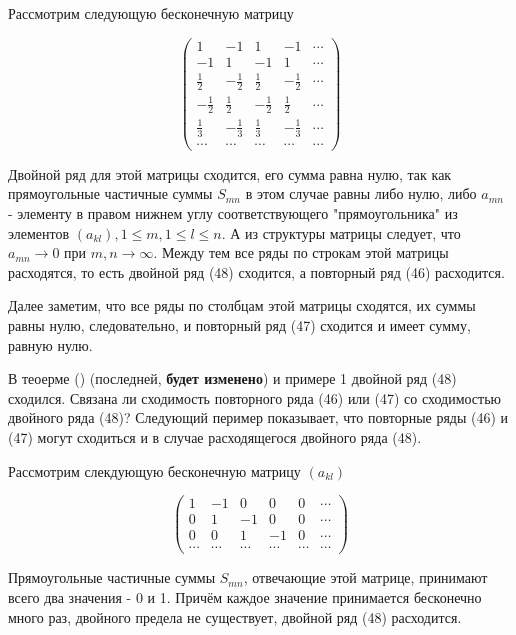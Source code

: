  \begin{exmpl}
 	Рассмотрим следующую бесконечную матрицу
 	
 	\begin{equation*}
 		\begin{pmatrix}
 			1 & -1 & 1 & -1 & \cdots \\
 			-1 & 1 & -1 & 1 & \cdots \\
 			\frac{1}{2} & -\frac{1}{2} & \frac{1}{2} & -\frac{1}{2} & \cdots \\
 			-\frac{1}{2} & \frac{1}{2} & -\frac{1}{2} & \frac{1}{2} & \cdots \\
 			\frac{1}{3} & -\frac{1}{3} & \frac{1}{3} & -\frac{1}{3} & \cdots \\
 			\cdots & \cdots & \cdots & \cdots & \cdots
 		\end{pmatrix}
 	\end{equation*}
 	
 	Двойной ряд для этой матрицы сходится, его сумма равна нулю, так как прямоугольные частичные суммы $S_{mn}$ в этом случае равны либо нулю, либо $a_{mn}$ - элементу в правом нижнем углу соответствующего "прямоугольника" из элементов $(a_{kl}), 1 \leqslant m, 1 \leqslant l \leqslant n$. А из структуры матрицы следует, что $a_{mn} \rightarrow 0$ при $m, n \rightarrow \infty$. Между тем все ряды по строкам этой матрицы расходятся, то есть двойной ряд (48) сходится, а повторный ряд (46) расходится.
 	
 	Далее заметим, что все ряды по столбцам этой матрицы сходятся, их суммы равны нулю, следовательно, и повторный ряд (47) сходится и имеет сумму, равную нулю.
 \end{exmpl}
 
 \begin{note}
 	В теоерме () (последней, \textbf{будет изменено}) и примере 1 двойной ряд (48) сходился. Связана ли сходимость повторного ряда (46) или (47) со сходимостью двойного ряда (48)? Следующий пеример показывает, что повторные ряды (46) и (47) могут сходиться и в случае расходящегося двойного ряда (48).
 \end{note}
 
 \begin{exmpl}
 	Рассмотрим слекдующую бесконечную матрицу $(a_{kl})$
 	
 	\begin{equation*}
 		\begin{pmatrix}
 			1 & -1 & 0 & 0 & 0 & \cdots \\
 			0 & 1 & -1 & 0 & 0 & \cdots \\
 			0 & 0 & 1 & -1 & 0 & \cdots \\
 			\cdots & \cdots & \cdots & \cdots & \cdots & \cdots
 		\end{pmatrix}
 	\end{equation*}
 	
 	Прямоугольные частичные суммы $S_{mn}$, отвечающие этой матрице, принимают всего два значения - 0 и 1. Причём каждое значение принимается бесконечно много раз, двойного предела не существует, двойной ряд (48) расходится.
 \end{exmpl}
 

